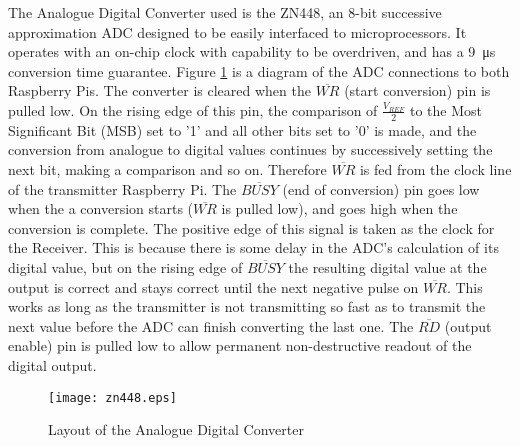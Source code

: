 \documentclass[../main.tex]{subfiles}
\begin{document}
The Analogue Digital Converter used is the ZN448, an 8-bit successive approximation ADC designed to be easily interfaced to microprocessors.
It operates with an on-chip clock with capability to be overdriven, and has a \SI{9}{\micro\second} conversion time guarantee.
Figure \ref{fig_ADC Layout} is a diagram of the ADC connections to both Raspberry Pis.
The converter is cleared when the $\overline{WR}$ (start conversion) pin is pulled low.
On the rising edge of this pin, the comparison of $\frac{V_{REF}}{2}$ to the Most Significant Bit (MSB) set to '1' and all other bits set to '0' is made, and the conversion from analogue to digital values continues by successively setting the next bit, making a comparison and so on.
Therefore $\overline{WR}$ is fed from the clock line of the transmitter Raspberry Pi.
The $\overline{BUSY}$ (end of conversion) pin goes low when the a conversion starts ($\overline{WR}$ is pulled low), and goes high when the conversion is complete.
The positive edge of this signal is taken as the clock for the Receiver.
This is because there is some delay in the ADC's calculation of its digital value, but on the rising edge of $\overline{BUSY}$ the resulting digital value at the output is correct and stays correct until the next negative pulse on $\overline{WR}$.
This works as long as the transmitter is not transmitting so fast as to transmit the next value before the ADC can finish converting the last one.
The $\overline{RD}$ (output enable) pin is pulled low to allow permanent non-destructive readout of the digital output.\\

\begin{figure}[ht]
	\centering
	\texttt{[image: zn448.eps]}
	\caption{Layout of the Analogue Digital Converter}
	\label{fig_ADC Layout}
\end{figure}
\end{document}
